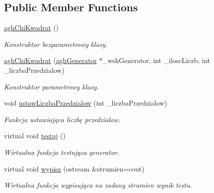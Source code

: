 \subsection*{\-Public \-Member \-Functions}
\begin{DoxyCompactItemize}
\item 
\hypertarget{classaghChiKwadrat_a82ef352017c05e8a111a19200525c65e}{\hyperlink{classaghChiKwadrat_a82ef352017c05e8a111a19200525c65e}{agh\-Chi\-Kwadrat} ()}\label{classaghChiKwadrat_a82ef352017c05e8a111a19200525c65e}

\begin{DoxyCompactList}\small\item\em \-Konstruktor bezparametrowy klasy. \end{DoxyCompactList}\item 
\hyperlink{classaghChiKwadrat_ac0f7804068dddd48a41a6045bba597c2}{agh\-Chi\-Kwadrat} (\hyperlink{classaghGenerator}{agh\-Generator} $\ast$\-\_\-wsk\-Generator, int \-\_\-ilosc\-Liczb, int \-\_\-liczba\-Przedzialow)
\begin{DoxyCompactList}\small\item\em \-Konstruktor parametrowy klasy. \end{DoxyCompactList}\item 
\hypertarget{classaghChiKwadrat_a8246e5e80c1bbed7c68b33c9e3a432dc}{void \hyperlink{classaghChiKwadrat_a8246e5e80c1bbed7c68b33c9e3a432dc}{ustaw\-Liczba\-Przedzialow} (int \-\_\-liczba\-Przedzialow)}\label{classaghChiKwadrat_a8246e5e80c1bbed7c68b33c9e3a432dc}

\begin{DoxyCompactList}\small\item\em \-Funkcja ustawiająca liczbę przedzialow. \end{DoxyCompactList}\item 
\hypertarget{classaghChiKwadrat_a533a052340dae56d6209093cc8c7365e}{virtual void \hyperlink{classaghChiKwadrat_a533a052340dae56d6209093cc8c7365e}{testuj} ()}\label{classaghChiKwadrat_a533a052340dae56d6209093cc8c7365e}

\begin{DoxyCompactList}\small\item\em \-Wirtualna funkcja testująca generator. \end{DoxyCompactList}\item 
virtual void \hyperlink{classaghChiKwadrat_a6d86b271437ada0f232164812a3671c5}{wypisz} (ostream \&strumien=cout)
\begin{DoxyCompactList}\small\item\em \-Wirtualna funkcja wypisująca na zadany strumien wynik testu. \end{DoxyCompactList}\end{DoxyCompactItemize}


